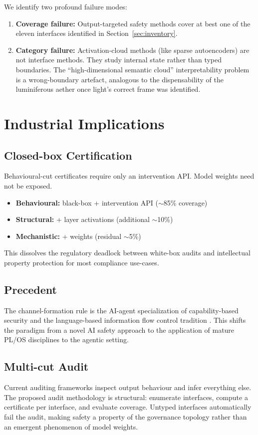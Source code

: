 \documentclass[acmsmall,screen,nonacm]{acmart}
\begin{document}
We identify two profound failure modes:
\begin{enumerate}
    \item \textbf{Coverage failure:} Output-targeted safety methods cover at best one of the eleven interfaces identified in Section~\ref{sec:inventory}.
    \item \textbf{Category failure:} Activation-cloud methods (like sparse autoencoders) are not interface methods. They study internal state rather than typed boundaries. The ``high-dimensional semantic cloud'' interpretability problem is a wrong-boundary artefact, analogous to the dispensability of the luminiferous aether once light's correct frame was identified.
\end{enumerate}

\section{Industrial Implications}\label{sec:industrial}

\subsection{Closed-box Certification}
Behavioural-cut certificates require only an intervention API. Model weights need not be exposed.
\begin{itemize}
\item \textbf{Behavioural:} black-box + intervention API ($\sim$85\% coverage)
\item \textbf{Structural:} + layer activations (additional $\sim$10\%)
\item \textbf{Mechanistic:} + weights (residual $\sim$5\%)
\end{itemize}
This dissolves the regulatory deadlock between white-box audits and intellectual property protection for most compliance use-cases.

\subsection{Precedent}
The channel-formation rule is the AI-agent specialization of capability-based security \cite{levy1984capability,miller2003capability} and the language-based information flow control tradition \cite{denning1976lattice,goguen1982security,myers1997decentralized,sabelfeld2003language}. This shifts the paradigm from a novel AI safety approach to the application of mature PL/OS disciplines to the agentic setting.

\subsection{Multi-cut Audit}
Current auditing frameworks inspect output behaviour and infer everything else. The proposed audit methodology is structural: enumerate interfaces, compute a certificate per interface, and evaluate coverage. Untyped interfaces automatically fail the audit, making safety a property of the governance topology rather than an emergent phenomenon of model weights.
\end{document}
